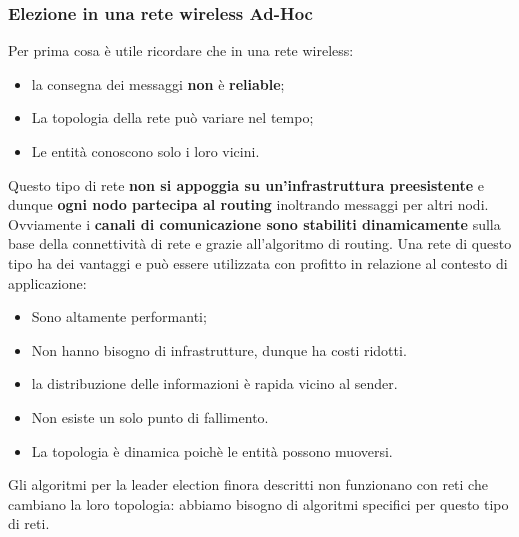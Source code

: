 \documentclass[12pt]{article}
\begin{document}
		\subsubsection{Elezione in una rete wireless Ad-Hoc}
			Per prima cosa è utile ricordare che in una rete wireless:
			\begin{itemize}
				\item la consegna dei messaggi \textbf{non} è \textbf{reliable};
				\item La topologia della rete può variare nel tempo;
				\item Le entità conoscono solo i loro vicini.
			\end{itemize}
			Questo tipo di rete \textbf{non si appoggia su un'infrastruttura preesistente} e dunque \textbf{ogni nodo partecipa al routing} inoltrando messaggi per altri nodi. Ovviamente i \textbf{canali di comunicazione sono stabiliti dinamicamente} sulla base della connettività di rete e grazie all'algoritmo di routing.
			Una rete di questo tipo ha dei vantaggi e può essere utilizzata con profitto in relazione al  contesto di applicazione:
			\begin{itemize}
				\item Sono altamente performanti;
				\item Non hanno bisogno di infrastrutture, dunque ha costi ridotti.
				\item la distribuzione delle informazioni è rapida vicino al sender.
				\item Non esiste un solo punto di fallimento.
				\item La topologia è dinamica poichè le entità possono muoversi.
			\end{itemize} 
			Gli algoritmi per la leader election finora descritti non funzionano con reti che cambiano la loro topologia: abbiamo bisogno di algoritmi specifici per questo tipo di reti.\\
\end{document}

